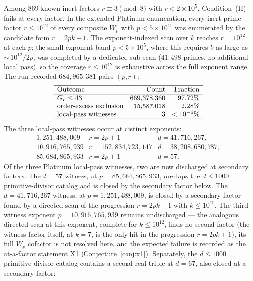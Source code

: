 \documentclass[11pt]{amsart}
\theoremstyle{plain}
\theoremstyle{definition}
\theoremstyle{remark}
\numberwithin{equation}{section}
\begin{document}
Among 869 known inert factors $r\equiv3\pmod8$ with $r<2\times10^5$, Condition~(II) fails at every factor. In the extended Platinum enumeration, every inert prime factor $r\leq10^{12}$ of every composite $W_p$ with $p<5\times10^{11}$ was enumerated by the candidate form $r=2pk+1$. The exponent-indexed scan over $k$ reaches $r=10^{12}$ at each $p$; the small-exponent band $p<5\times10^5$, where this requires $k$ as large as ${\sim}\,10^{12}/2p$, was completed by a dedicated sub-scan ($41{,}498$ primes, no additional local pass), so the coverage $r\leq10^{12}$ is exhaustive across the full exponent range. The run recorded $684{,}965{,}381$ pairs $(p,r)$:
\[
\begin{array}{lrr}
\hline
\text{Outcome} & \text{Count} & \text{Fraction}\\
\hline
G_r\leq43 & 669{,}378{,}360 & 97.72\%\\
\text{order-excess exclusion} & 15{,}587{,}018 & 2.28\%\\
\text{local-pass witnesses} & 3 & <10^{-6}\%\\
\hline
\end{array}
\]
The three local-pass witnesses occur at distinct exponents:
\[
\begin{array}{rll}
1{,}251{,}488{,}009 & r=2p+1 & d=41{,}716{,}267,\\
10{,}916{,}765{,}939 & r=152{,}834{,}723{,}147 & d=38{,}208{,}680{,}787,\\
85{,}684{,}865{,}933 & r=2p+1 & d=57.
\end{array}
\]
Of the three Platinum local-pass witnesses, two are now discharged at secondary factors. The $d=57$ witness, at $p=85{,}684{,}865{,}933$, overlaps the $d\leq1000$ primitive-divisor catalog and is closed by the secondary factor below. The $d=41{,}716{,}267$ witness, at $p=1{,}251{,}488{,}009$, is closed by a secondary factor found by a directed scan of the progression $r=2pk+1$ with $k\leq10^{11}$. The third witness exponent $p=10{,}916{,}765{,}939$ remains undischarged --- the analogous directed scan at this exponent, complete for $k\leq10^{12}$, finds no second factor (the witness factor itself, at $k=7$, is the only hit in the progression $r=2pk+1$), its full $W_p$ cofactor is not resolved here, and the expected failure is recorded as the at-a-factor statement X1 (Conjecture~\ref{conj:x1}). Separately, the $d\leq1000$ primitive-divisor catalog contains a second real triple at $d=67$, also closed at a secondary factor:
\end{document}
